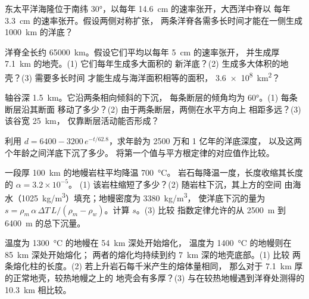 \begin{exercise}[$\star\star$]\label{exo:g11:ocean-ridges:8}
东太平洋海隆位于南纬 \ang{30}，以每年 \qty{14.6}{cm} 的速率张开，大西洋中脊以
每年 \qty{3.3}{cm} 的速率张开。假设两侧对称扩张，
两条洋脊各需多长时间才能在一侧生成 \qty{1000}{km} 的洋底？
\end{exercise}

\begin{exercise}[$\star\star$]\label{exo:g11:ocean-ridges:9}
洋脊全长约 \qty{65000}{km}。假设它们平均以每年 \qty{5}{cm} 的速率张开，
并生成厚 \qty{7.1}{km} 的地壳。(1) 它们每年生成多大面积的
新洋底？(2) 生成多大体积的地壳？(3) 需要多长时间
才能生成与海洋面积相等的面积，
\qty{3.6e8}{km^2}？
\end{exercise}

\begin{exercise}[$\star\star$]\label{exo:g11:ocean-ridges:10}
轴谷深 \qty{1.5}{km}。它沿两条相向倾斜的下沉，
每条断层的倾角均为 \ang{60}。(1) 每条断层沿其断面
移动了多少？(2) 由于两条断层，两侧在水平方向上
相距多远？(3) 该谷宽 \qty{25}{km}，
仅靠断层活动能否形成？
\end{exercise}

\begin{exercise}[$\star\star$]\label{exo:g11:ocean-ridges:11}
利用 $d = 6400 - 3200\,e^{-t/62.8}$，求年龄为 2500 万和 1 亿年的洋底深度，
以及这两个年龄之间洋底下沉了多少。
将第一个值与平方根定律的对应值作比较。
\end{exercise}

\begin{exercise}[$\star\star\star$]\label{exo:g11:ocean-ridges:12}
一段厚 \qty{100}{km} 的地幔岩柱平均降温 \qty{700}{\celsius}。
岩石每降温一度，长度收缩其长度的 $\alpha = 3.2 \times 10^{-5}$。
(1) 该岩柱缩短了多少？(2) 随岩柱下沉，其上方的空间
由海水（\qty{1025}{kg/m^3}）填充；地幔密度为 \qty{3380}{kg/m^3}，
使洋底下沉的量为
$s = \rho_m\,\alpha\,\Delta T\,L/(\rho_m - \rho_w)$。计算 $s$。(3) 比较
指数定律允许的从 \qty{2500}{m} 到
\qty{6400}{m} 的总下沉量。
\end{exercise}

\begin{exercise}[$\star\star\star$]\label{exo:g11:ocean-ridges:13}
温度为 \qty{1300}{\celsius} 的地幔在 \qty{54}{km} 深处开始熔化，
温度为 \qty{1400}{\celsius} 的地幔则在 \qty{85}{km} 深处开始熔化；
两者的熔化均持续到约 \qty{7}{km} 深的地壳底部。(1) 比较
两条熔化柱的长度。(2) 若上升岩石每千米产生的熔体量相同，
那么对于 \qty{7.1}{km} 厚的正常地壳，较热地幔之上的
地壳会有多厚？(3) 与在较热地幔遇到洋脊处测得的
\qty{10.3}{km} 相比较。
\end{exercise}


